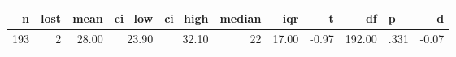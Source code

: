 \begin{tabular}{rrrrrrrrrlr}
  \toprule
n & lost & mean & ci\_low & ci\_high & median & iqr & t & df & p & d \\ 
  \midrule
193 &   2 & 28.00 & 23.90 & 32.10 &  22 & 17.00 & -0.97 & 192.00 & .331 & -0.07 \\ 
   \bottomrule
\end{tabular}

